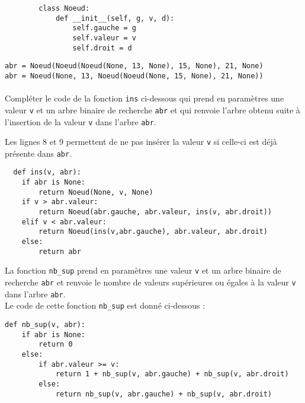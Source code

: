 \documentclass[a4paper,12pt,article,firamath]{nsi}
\begin{document}
\begin{verbatim}
        class Noeud:
            def __init__(self, g, v, d):
                self.gauche = g
                self.valeur = v
                self.droit = d
\end{verbatim}



\texttt{abr = Noeud(Noeud(Noeud(None, 13, None), 15, None), 21, None)}\\
\texttt{abr = Noeud(None, 13, Noeud(Noeud(None, 15, None), 21, None))}\\
\\


\question Compléter le code de la fonction \texttt{ins} ci-dessous qui
prend en paramètres une valeur \texttt{v} et un arbre binaire de recherche \texttt{abr} et qui
renvoie l'arbre obtenu suite à l'insertion de la valeur \texttt{v} dans l'arbre \texttt{abr}.

Les lignes 8 et 9 permettent de ne pas insérer la valeur \texttt{v} si celle-ci est déjà présente dans \texttt{abr}.


\begin{verbatim}
  def ins(v, abr):
    if abr is None:
        return Noeud(None, v, None)
    if v > abr.valeur:
        return Noeud(abr.gauche, abr.valeur, ins(v, abr.droit))
    elif v < abr.valeur:
        return Noeud(ins(v,abr.gauche), abr.valeur, abr.droit)
    else:
        return abr      
\end{verbatim}

La fonction \texttt{nb_sup} prend en paramètres une valeur \texttt{v} et un arbre binaire de recherche \texttt{abr} et renvoie le nombre de valeurs supérieures ou égales à la valeur \texttt{v} dans l'arbre \texttt{abr}.\\

Le code de cette fonction \texttt{nb_sup} est donné ci-dessous :

\begin{verbatim}
def nb_sup(v, abr):
    if abr is None:
        return 0
    else:
        if abr.valeur >= v:
            return 1 + nb_sup(v, abr.gauche) + nb_sup(v, abr.droit)
        else:
            return nb_sup(v, abr.gauche) + nb_sup(v, abr.droit)
\end{verbatim}
\end{document}
